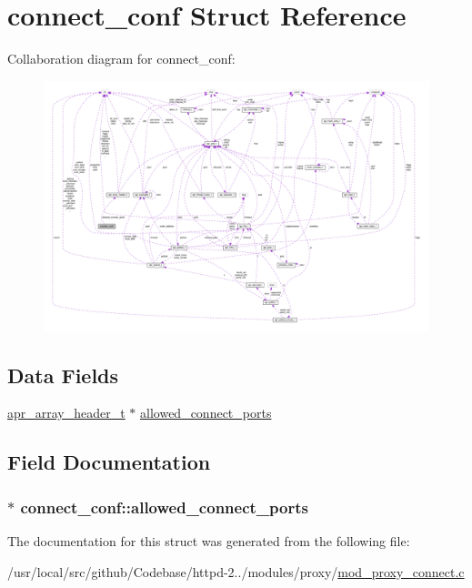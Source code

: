 \hypertarget{structconnect__conf}{}\section{connect\+\_\+conf Struct Reference}
\label{structconnect__conf}


Collaboration diagram for connect\+\_\+conf\+:
\nopagebreak
\begin{figure}[H]
\begin{center}
\leavevmode
\includegraphics[width=350pt]{structconnect__conf__coll__graph}
\end{center}
\end{figure}
\subsection*{Data Fields}
\begin{DoxyCompactItemize}
\item 
\hyperlink{structapr__array__header__t}{apr\+\_\+array\+\_\+header\+\_\+t} $\ast$ \hyperlink{structconnect__conf_abfe9167635a83a4bc2d29e645154b6f0}{allowed\+\_\+connect\+\_\+ports}
\end{DoxyCompactItemize}


\subsection{Field Documentation}
\subsubsection[{\texorpdfstring{allowed\+\_\+connect\+\_\+ports}{allowed_connect_ports}}]{$\ast$ connect\+\_\+conf\+::allowed\+\_\+connect\+\_\+ports}\hypertarget{structconnect__conf_abfe9167635a83a4bc2d29e645154b6f0}{}\label{structconnect__conf_abfe9167635a83a4bc2d29e645154b6f0}


The documentation for this struct was generated from the following file\+:\begin{DoxyCompactItemize}
\item 
/usr/local/src/github/\+Codebase/httpd-\/2../modules/proxy/\hyperlink{mod__proxy__connect_8c}{mod\+\_\+proxy\+\_\+connect.\+c}\end{DoxyCompactItemize}
